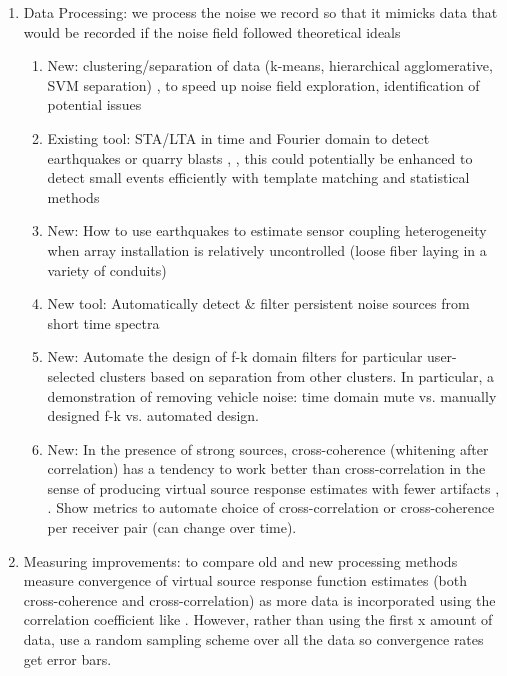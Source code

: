 \documentclass[11pt]{article}
\begin{document}
\begin{enumerate}
\begin{enumerate}
		\end{enumerate}
	\vspace{-0.3cm}
	\item Data Processing: we process the noise we record so that it mimicks data that would be recorded if the noise field followed theoretical ideals \cite{Bensen2007}
		\begin{enumerate}
		\vspace{-0.2cm}
		\item New: clustering/separation of data (k-means, hierarchical agglomerative, SVM separation) \cite{Liao2005}, \cite{Hastie2009} to speed up noise field exploration, identification of potential issues
		\vspace{-0.2cm}
		\item Existing tool: STA/LTA \cite{Withers1998} in time and Fourier domain to detect earthquakes or quarry blasts \cite{Bensen2007}, \cite{Girard2016}, this could potentially be enhanced to detect small events efficiently with template matching and statistical methods \cite{Yoon2015}
		\vspace{-0.2cm}
		\item New: How to use earthquakes to estimate sensor coupling heterogeneity when array installation is relatively uncontrolled (loose fiber laying in a variety of conduits) 
		\vspace{-0.2cm}
		\item New tool: Automatically detect \& filter persistent noise sources from short time spectra
		\vspace{-0.6cm}
		\item New: Automate the design of f-k domain filters for particular user-selected clusters based on separation from other clusters. In particular, a demonstration of removing vehicle noise: time domain mute vs. manually designed f-k vs. automated design. 
		\vspace{-0.2cm}
		\item New: In the presence of strong sources, cross-coherence (whitening after correlation) has a tendency to work better than cross-correlation in the sense of producing virtual source response estimates with fewer artifacts \cite{Nakata2011}, \cite{Martin2016}. Show metrics to automate choice of cross-correlation or cross-coherence per receiver pair (can change over time).
		\end{enumerate}
	\vspace{-0.2cm}
	\item Measuring improvements: to compare old and new processing methods measure convergence of virtual source response function estimates (both cross-coherence and cross-correlation) as more data is incorporated using the correlation coefficient like \cite{Seats2012}. However, rather than using the first x amount of data, use a random sampling scheme over all the data so convergence rates get error bars.

\end{enumerate}
\end{document}

